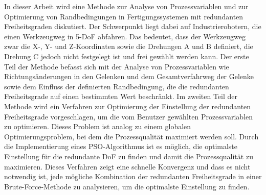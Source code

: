 {%
	In dieser Arbeit wird eine Methode zur Analyse von Prozessvariablen und zur Optimierung von Randbedingungen in Fertigungssystemen mit redundanten Freiheitsgraden diskutiert. Der Schwerpunkt liegt dabei auf Industrierobotern, die einen Werkzeugweg in 5-DoF abfahren. Das bedeutet, dass der Werkzeugweg zwar die X-, Y- und Z-Koordinaten sowie die Drehungen A und B definiert, die Drehung C jedoch nicht festgelegt ist und frei gewählt werden kann. Der erste Teil der Methode befasst sich mit der Analyse von Prozessvariablen wie Richtungsänderungen in den Gelenken und dem Gesamtverfahrweg der Gelenke sowie dem Einfluss der definierten Randbedingung, die die redundanten Freiheitsgrade auf einen bestimmten Wert beschränkt.
	Im zweiten Teil der Methode wird ein Verfahren zur Optimierung der Einstellung der redundanten Freiheitsgrade vorgeschlagen, um die vom Benutzer gewählten Prozessvariablen zu optimieren. Dieses Problem ist analog zu einem globalen Optimierungsproblem, bei dem die Prozessqualität maximiert werden soll. Durch die Implementierung eines PSO-Algorithmus ist es möglich, die optimalste Einstellung für die redundante DoF zu finden und damit die Prozessqualität zu maximieren. Dieses Verfahren zeigt eine schnelle Konvergenz und dass es nicht notwendig ist, jede mögliche Kombination der redundanten Freiheitsgrade in einer Brute-Force-Methode zu analysieren, um die optimalste Einstellung zu finden.
}%
%
%
